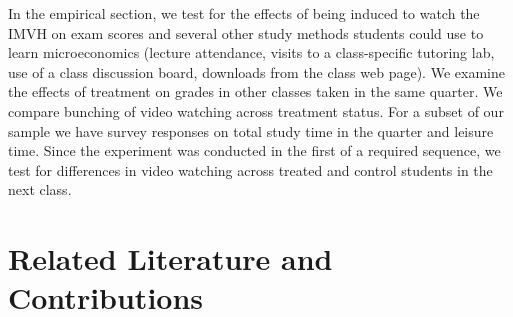\documentclass[12pt]{article}
\begin{document}
In the empirical section, we test for the effects of being induced to watch the IMVH on exam scores and several other study methods students could use to learn microeconomics (lecture attendance, visits to a class-specific tutoring lab, use of a class discussion board, downloads from the class web page). We examine the effects of treatment on grades in other classes taken in the same quarter. We compare bunching of video watching across treatment status.  For a subset of our sample we have survey responses on total study time in the quarter and leisure time. Since the experiment was conducted in the first of a required sequence, we test for differences in video watching across treated and control students in the next class. 

\section{Related Literature and Contributions} \label{background}
\end{document}
